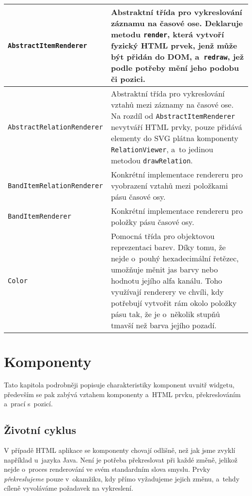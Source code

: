 				\begin{longtable}{|p{}p{}|}
					\hline
					{\tt AbstractItemRenderer} & Abstraktní třída pro vykreslování záznamu na časové ose. Deklaruje metodu {\tt render}, která vytvoří fyzický HTML prvek, jenž může být přidán do DOM, a~{\tt redraw}, jež podle potřeby mění jeho podobu či pozici. \\
					\hline
					\tt AbstractRelation\-Renderer & Abstraktní třída pro vykreslování vztahů mezi záznamy na časové ose. Na rozdíl od {\tt AbstractItemRenderer} nevytváří HTML prvky, pouze přidává elementy do SVG plátna komponenty {\tt RelationViewer}, a~to jedinou metodou {\tt drawRelation}.\\
					\hline
					\tt BandItemRelation\-Renderer & Konkrétní implementace rendereru pro vyobrazení vztahů mezi položkami pásu časové osy.\\
					\hline
					\tt BandItemRenderer & Konkrétní implementace rendereru pro položky pásu časové osy.\\
					\hline
					\tt Color & Pomocná třída pro objektovou reprezentaci barev. Díky tomu, že nejde o~pouhý hexadecimální řetězec, umožňuje měnit jas barvy nebo hodnotu jejího alfa kanálu. Toho využívají renderery ve chvíli, kdy potřebují vytvořit rám okolo položky pásu tak, že je o~několik stupňů tmavší než barva jejího pozadí.\\
					\hline
				\end{longtable}
				
		\section{Komponenty}
		Tato kapitola podrobněji popisuje charakteristiky komponent uvnitř widgetu, především se pak zabývá vztahem komponenty a~HTML prvku, překreslováním a~prací s~pozicí.
			
			\subsection{Životní cyklus}
				V případě HTML aplikace se komponenty chovají odlišně, než jak jsme zvyklí například u~jazyka {\sf Java}. Není je potřeba překreslovat při každé změně, jelikož nejde o~proces renderování ve svém standardním slova smyslu. Prvky \emph{překreslu\-jeme} pouze v~okamžiku, kdy přímo vyžadujeme jejich změnu, a~tehdy cíleně vyvoláváme požadavek na vykreslení.
				
